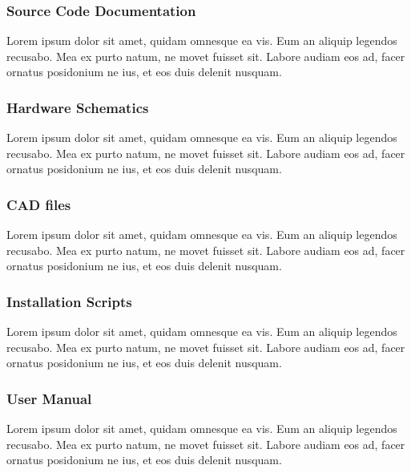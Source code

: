 \subsubsection{Source Code Documentation}
Lorem ipsum dolor sit amet, quidam omnesque ea vis. Eum an aliquip legendos recusabo. Mea ex purto natum, ne movet fuisset sit. Labore audiam eos ad, facer ornatus posidonium ne ius, et eos duis delenit nusquam.

\subsubsection{Hardware Schematics}
Lorem ipsum dolor sit amet, quidam omnesque ea vis. Eum an aliquip legendos recusabo. Mea ex purto natum, ne movet fuisset sit. Labore audiam eos ad, facer ornatus posidonium ne ius, et eos duis delenit nusquam.

\subsubsection{CAD files}
Lorem ipsum dolor sit amet, quidam omnesque ea vis. Eum an aliquip legendos recusabo. Mea ex purto natum, ne movet fuisset sit. Labore audiam eos ad, facer ornatus posidonium ne ius, et eos duis delenit nusquam.

\subsubsection{Installation Scripts}
Lorem ipsum dolor sit amet, quidam omnesque ea vis. Eum an aliquip legendos recusabo. Mea ex purto natum, ne movet fuisset sit. Labore audiam eos ad, facer ornatus posidonium ne ius, et eos duis delenit nusquam.

\subsubsection{User Manual}
Lorem ipsum dolor sit amet, quidam omnesque ea vis. Eum an aliquip legendos recusabo. Mea ex purto natum, ne movet fuisset sit. Labore audiam eos ad, facer ornatus posidonium ne ius, et eos duis delenit nusquam.
